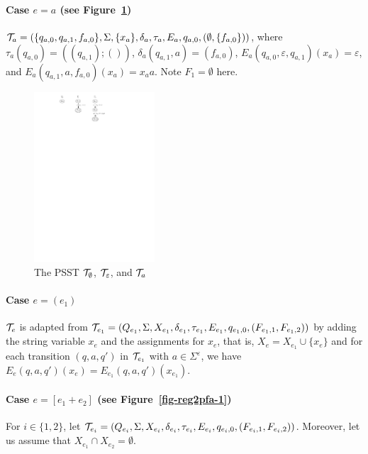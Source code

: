 \paragraph{Case $e = a$ (see Figure~\ref{fig-reg2pfa-0})} $\mathcal{T}_a = (\{q_{a,0}, q_{a,1}, f_{a,0}\}, \Sigma, \{x_a\}, \delta_a, \tau_a, E_a, q_{a,0}, (\emptyset, \{f_{a,0}\}))$, where 
$\tau_a(q_{a,0}) = ((q_{a,1}); ())$, 
%
$\delta_a(q_{a,1}, a) = (f_{a,0})$, 
%
%
$E_a(q_{a,0}, \varepsilon, q_{a,1})(x_a) = \varepsilon$, and $E_a(q_{a,1}, a, f_{a,0})(x_a) =x_aa$. Note $F_1 = \emptyset$ here. 
%		
\begin{figure}[ht]
			\centering
			\includegraphics[width = 0.4\textwidth]{reg2pfa-0.pdf}
			\caption{The PSST $\mathcal{T}_{\emptyset}$, $\mathcal{T}_{\varepsilon}$, and $\mathcal{T}_{a}$ }
			\label{fig-reg2pfa-0}
\end{figure}  

		
\paragraph{Case $e = (e_1)$} $\mathcal{T}_e$ is adapted from $\mathcal{T}_{e_1} = (Q_{e_1}, \Sigma, X_{e_1}, \delta_{e_1}, \tau_{e_1}, E_{e_1},  q_{e_1,0}, (F_{e_1,1}, F_{e_1,2}))$ by adding the string variable $x_e$ and the assignments for $x_e$, that is, $X_e = X_{e_1} \cup \{x_e\}$ and for each transition $(q, a, q')$ in $\mathcal{T}_{e_1} $ with $a \in \Sigma^\varepsilon$, we have $E_e(q, a, q')(x_e) = E_{e_1}(q, a, q')(x_{e_1})$. 
		

\paragraph{Case $e = [e_1 + e_2]$ (see Figure~\ref{fig-reg2pfa-1})} For $i \in \{1, 2\}$, let  
$\mathcal{T}_{e_i} = (Q_{e_i}, \Sigma, X_{e_i}, \delta_{e_i}, \tau_{e_i}, E_{e_i},  q_{e_i,0}, (F_{e_i,1}, F_{e_i,2}))$. Moreover, let us assume that $X_{e_1} \cap X_{e_2} = \emptyset$.
 

